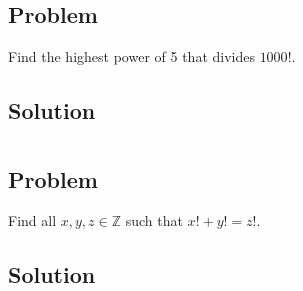 \documentclass[12pt]{article}
\newcommand{\Z}    [0]{\mathbb{Z}                   }
\begin{document}
\section{}

\subsection{Problem}
Find the highest power of 5 that divides $1000!$.

\subsection{Solution}



\section{}

\subsection{Problem}
Find all $x, y, z \in \Z$ such that $x! + y! = z!$.

\subsection{Solution}
\end{document}
